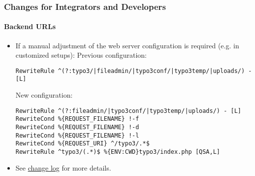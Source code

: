 %

\begin{frame}[fragile]
	\frametitle{Changes for Integrators and Developers}
	\framesubtitle{Backend URLs}


	\begin{itemize}
		\item If a manual adjustment of the web server configuration is required
			(e.g. in customized setups):\newline
		\smaller
			Previous configuration:
		\normalsize
\begin{lstlisting}
RewriteRule ^(?:typo3/|fileadmin/|typo3conf/|typo3temp/|uploads/) - [L]
\end{lstlisting}

		\smaller
			New configuration:
		\normalsize
\begin{lstlisting}
RewriteRule ^(?:fileadmin/|typo3conf/|typo3temp/|uploads/) - [L]
RewriteCond %{REQUEST_FILENAME} !-f
RewriteCond %{REQUEST_FILENAME} !-d
RewriteCond %{REQUEST_FILENAME} !-l
RewriteCond %{REQUEST_URI} ^/typo3/.*$
RewriteRule ^typo3/(.*)$ %{ENV:CWD}typo3/index.php [QSA,L]
\end{lstlisting}

		\item See \href{https://docs.typo3.org/c/typo3/cms-core/master/en-us/Changelog/11.0/Breaking-93048-BackendURLRewrites.html}{change log}
			for more details.

	\end{itemize}
\end{frame}

